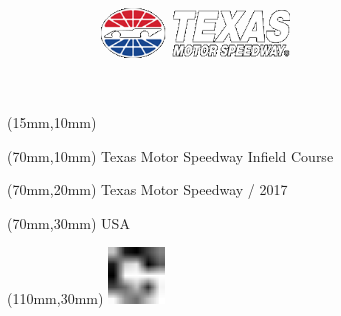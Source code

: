 \null\newpage
\begin{textblock*}{50mm}(15mm,10mm)%
\includegraphics[width=50mm]{LG/TEX.png}
\end{textblock*}
\begin{textblock*}{130mm}(70mm,10mm)%
{\fontsize{20}{20}\selectfont Texas Motor Speedway Infield Course}\\
\end{textblock*}
\begin{textblock*}{120mm}(70mm,20mm)%
{\fontsize{16}{16}\selectfont Texas Motor Speedway / 2017}\\
\end{textblock*}
\begin{textblock*}{120mm}(70mm,30mm)%
{\fontsize{12}{12}\selectfont USA}
\end{textblock*}
\begin{textblock*}{30mm}(110mm,30mm)%
\centering
\includegraphics[height=15mm]{icons/fa-rotate-right.pdf}
\end{textblock*}
